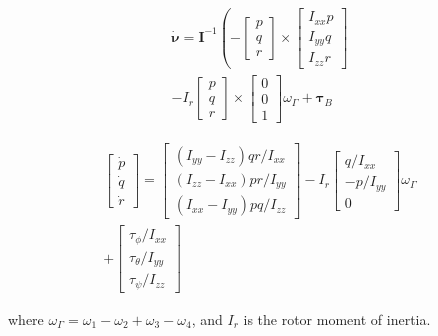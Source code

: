 $$
\begin{array}{c}
  \boldsymbol{\dot{\nu}}=\boldsymbol{I}^{-1}\left(-\left[ \begin{array}{c}{p} \\ {q} \\ {r}\end{array}\right] \times \left[ \begin{array}{c}{I_{x x} p} \\ {I_{y y} q} \\ {I_{z z} r}\end{array}\right]\right.\\
   -I_{r} \left[ \begin{array}{c}{p} \\ {q} \\ {r}\end{array}\right] \times \left[ \begin{array}{c}{0} \\ {0} \\ {1}\end{array}\right] \omega_{\Gamma}+\boldsymbol{\tau}_B
\end{array}
$$

$$
\begin{array}{c}
\left[ \begin{array}{c}{\dot{p}} \\ {\dot{q}} \\ {\dot{r}}\end{array}\right]= 
\left[ \begin{array}{c}{\left(I_{y y}-I_{z z}\right) q r / I_{x x}} \\ {\left(I_{z z}-I_{x x}\right) p r / I_{y y}} \\ {(I_{x x}-I_{y y}) p q / I_{z z}}\end{array}\right] 
- I_{r} \left[ \begin{array}{c}{q / I_{x x}} \\ {-p / I_{y y}} \\ {0}\end{array}\right] \omega_{\Gamma} \\
+ \left[ \begin{array}{c}{\tau_{\phi} / I_{x x}} \\ {\tau_{\theta} / I_{y y}} \\ {\tau_{\psi} / I_{z z}}\end{array}\right]
\end{array}
  $$

  where $\omega_\Gamma = \omega_1 - \omega_2 + \omega_3 - \omega_4$, and $I_r$ is the rotor moment of inertia.


